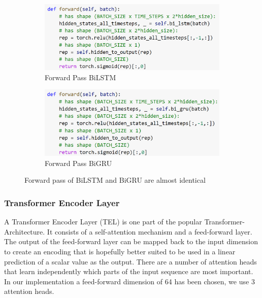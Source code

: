 \documentclass[utf8x]{ctexart}
\begin{document}
\begin{figure}[htb]
  \centering
  \begin{subfigure}[b]{0.48\textwidth}
    \centering
    \includegraphics[width=\textwidth]{../images/forward_pass_lstm.png}
    \caption{Forward Pass BiLSTM}
    \label{fig:forwardpasses1_lstm}
  \end{subfigure}
  \begin{subfigure}[b]{0.48\textwidth}
    \centering
    \includegraphics[width=\textwidth]{../images/forward_pass_gru.png}
    \caption{Forward Pass BiGRU}
    \label{fig:forwardpasses1_gru}
  \end{subfigure}
  \caption{Forward pass of BiLSTM and BiGRU are almost identical}
  \label{fig:forwardpasses1}
\end{figure}


\subsubsection{Transformer Encoder Layer}

A Transformer Encoder Layer (TEL) is one part of the popular Transformer-Architecture. It consists of a self-attention mechanism and a feed-forward layer. The output of the feed-forward layer can be mapped back to the input dimension to create an encoding that is hopefully better suited to be used in a linear prediction of a scalar value as the output. There are a number of attention heads that learn independently which parts of the input sequence are most important. In our implementation a feed-forward dimension of 64 has been chosen, we use 3 attention heads.
\end{document}
